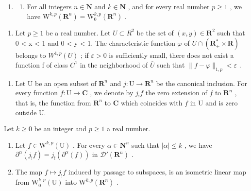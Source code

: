 \begin{enumerate}
\def\labelenumi{\arabic{enumi})}
\setcounter{enumi}{11}
\tightlist
\item
  \begin{enumerate}
  \def\labelenumii{\alph{enumii})}
  \tightlist
  \item
    For all integers \(n \in \mathbf{N}\) and \(k \in \mathbf{N}\) , and for every real number \(p \geqslant 1\) , we have \(\mathrm{W}^{k,p}(\mathbf{R}^n) = \mathrm{W}_0^{k,p}(\mathbf{R}^n)\) .
  \end{enumerate}
\end{enumerate}

\begin{enumerate}
\def\labelenumi{\alph{enumi})}
\setcounter{enumi}{1}
\tightlist
\item
  Let \(p \geqslant 1\) be a real number. Let \(U \subset R^{2}\) be the set of \((x, y) \in \mathbf{R}^{2}\) such that 0 \textless{} \textbar x\textbar{} \textless{} 1 and 0 \textless{} y \textless{} 1. The characteristic function \(\varphi\) of \(U \cap (\mathbf{R}_{+}^{*} \times \mathbf{R})\) belongs to \(W^{1,p}(U)\) ; if \(\varepsilon > 0\) is sufficiently small, there does not exist a function f of class \(C^{1}\) in the neighborhood of \(\overline{U}\) such that \(\|f - \varphi\|_{1,p} < \varepsilon\) .
\end{enumerate}

\begin{enumerate}
\def\labelenumi{\arabic{enumi})}
\setcounter{enumi}{12}
\tightlist
\item
  Let U be an open subset of \(\mathbf{R}^n\) and \(j\colon \mathrm{U}\to \mathbf{R}^n\) be the canonical inclusion. For every function \(f\colon \mathrm{U}\to \mathbf{C}\) , we denote by \(j_{!}f\) the zero extension of \(f\) to \(\mathbf{R}^n\) , that is, the function from \(\mathbf{R}^n\) to \(\mathbf{C}\) which coincides with \(f\) in U and is zero outside U.
\end{enumerate}

Let \(k \geqslant 0\) be an integer and \(p \geqslant 1\) a real number.

\begin{enumerate}
\def\labelenumi{\alph{enumi})}
\item
  Let \(f \in \mathrm{W}^{k,p}(\mathrm{U})\) . For every \(\alpha \in \mathbf{N}^n\) such that \(|\alpha| \leqslant k\) , we have \(\partial^\alpha(j_{!}f) = j_{!}(\partial^\alpha(f))\) in \(\mathcal{D}'(\mathbf{R}^n)\) .
\item
  The map \(f \mapsto j_{!}f\) induced by passage to subspaces, is an isometric linear map from \(\mathrm{W}_{0}^{k,p}(\mathrm{U})\) into \(\mathrm{W}^{k,p}(\mathbf{R}^{n})\) .
\end{enumerate}


